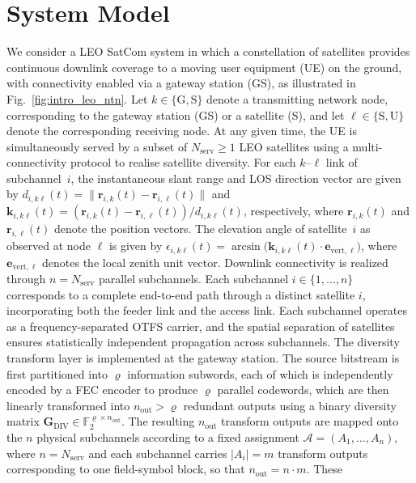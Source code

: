 \documentclass[lettersize,journal]{IEEEtran}
\newcommand{\vect}[1]{\bm{#1}}
\providecommand{\DIFaddend}{} %
\DeclareRobustCommand{\DIFaddend}{\DIFOaddend \let\includegraphics\DIFOincludegraphics} %
\begin{document}
\DIFaddend \section{System Model}
\label{sec:system_model}
We consider a LEO SatCom system in which a constellation of satellites 
provides continuous downlink coverage to a moving user equipment (UE) 
on the ground, with connectivity enabled via a gateway station (GS), 
as illustrated in Fig.~\ref{fig:intro_leo_ntn}. Let 
$k \in \{\mathrm{G},\mathrm{S}\}$ denote a transmitting network node, 
corresponding to the gateway station (GS) or a satellite (S), and let 
$\ell \in \{\mathrm{S},\mathrm{U}\}$ denote the corresponding receiving 
node. At any given time, the UE is simultaneously served by a subset of 
$N_{\text{serv}} \ge 1$ LEO satellites using a multi-connectivity 
protocol to realise satellite diversity. For each $k$--$\ell$ link of subchannel~$i$, the instantaneous slant 
range and LOS direction vector are given by 
$d_{i,k\ell}(t) = \|\vect{r}_{i,k}(t) - \vect{r}_{i,\ell}(t)\|$ and 
$\vect{k}_{i,k\ell}(t) = (\vect{r}_{i,k}(t) - 
\vect{r}_{i,\ell}(t))/d_{i,k\ell}(t)$, respectively, where 
$\vect{r}_{i,k}(t)$ and $\vect{r}_{i,\ell}(t)$ denote the position 
vectors. The elevation angle of satellite~$i$ 
as observed at node $\ell$ is given by 
$\epsilon_{i,k\ell}(t)=\arcsin\!\bigl(\vect{k}_{i,k\ell}(t) \cdot 
\vect{e}_{\mathrm{vert},\ell}\bigr)$, where 
$\vect{e}_{\mathrm{vert},\ell}$ denotes the local zenith unit vector. Downlink connectivity is realized through $n = N_{\text{serv}}$ parallel subchannels. Each subchannel $i \in \{1,\ldots,n\}$ corresponds to a complete end-to-end path through a distinct satellite $i$, incorporating both the feeder link and the access link. Each subchannel operates as a frequency-separated OTFS 
carrier, and the spatial separation of satellites ensures statistically 
independent propagation across subchannels. The diversity transform layer is implemented at the gateway station. The source bitstream is first partitioned into $\varrho$ information 
subwords, each of which is independently encoded by a FEC encoder to produce $\varrho$ parallel codewords, 
which are then linearly transformed into $n_{\text{out}} > \varrho$ 
redundant outputs using a binary diversity matrix 
$\mathbf{G}_{\mathrm{DIV}} \in \mathbb{F}_2^{\varrho \times n_{\text{out}}}$. The resulting $n_{\text{out}}$ transform outputs are mapped onto the $n$ physical subchannels according to a fixed assignment $\mathcal{A} = (A_1,\ldots,A_n)$, where $n = N_{\text{serv}}$ and each subchannel carries $|A_i| = m$ transform outputs corresponding to one field-symbol block, so that $n_{\text{out}} = n \cdot m$. These 
\end{document}
